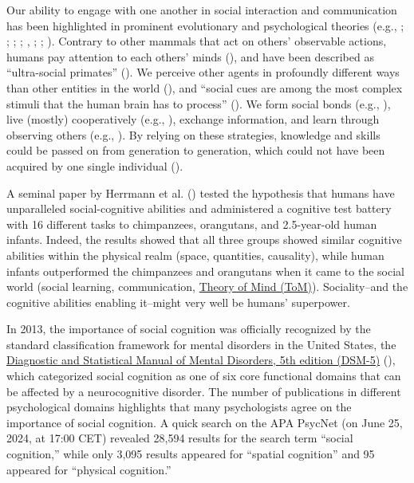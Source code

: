 \documentclass[
]{scrbook}
\begin{document}
Our ability to engage with one another in social interaction and communication has been highlighted in prominent evolutionary and psychological theories (e.g., ; ; ; ; , ; ; ). Contrary to other mammals that act on others' observable actions, humans pay attention to each others' minds (), and have been described as ``ultra-social primates'' (). We perceive other agents in profoundly different ways than other entities in the world (), and ``social cues are among the most complex stimuli that the human brain has to process'' (). We form social bonds (e.g., ), live (mostly) cooperatively (e.g., ), exchange information, and learn through observing others (e.g., ). By relying on these strategies, knowledge and skills could be passed on from generation to generation, which could not have been acquired by one single individual ().

A seminal paper by Herrmann et al. () tested the hypothesis that humans have unparalleled social-cognitive abilities and administered a cognitive test battery with 16 different tasks to chimpanzees, orangutans, and 2.5-year-old human infants. Indeed, the results showed that all three groups showed similar cognitive abilities within the physical realm (space, quantities, causality), while human infants outperformed the chimpanzees and orangutans when it came to the social world (social learning, communication, \hyperref[acronyms_ToM]{Theory of Mind (ToM)}). Sociality\thinspace --\thinspace and the cognitive abilities enabling it\thinspace --\thinspace might very well be humans' superpower.

In 2013, the importance of social cognition was officially recognized by the standard classification framework for mental disorders in the United States, the \hyperref[acronyms_DSM-5]{Diagnostic and Statistical Manual of Mental Disorders, 5th edition (DSM-5)} (), which categorized social cognition as one of six core functional domains that can be affected by a neurocognitive disorder. The number of publications in different psychological domains highlights that many psychologists agree on the importance of social cognition. A quick search on the APA PsycNet (on June 25, 2024, at 17:00 CET) revealed 28,594 results for the search term ``social cognition,'' while only 3,095 results appeared for ``spatial cognition'' and 95 appeared for ``physical cognition.''
\end{document}
